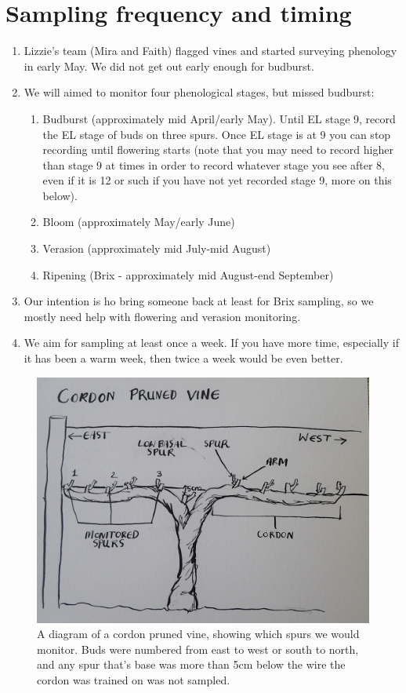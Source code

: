 \documentclass[11pt,letter]{article}
\begin{document}
\section{Sampling frequency and timing}
\begin{enumerate}
  \item Lizzie's team (Mira and Faith) flagged vines and started surveying phenology in early May. We did not get out early enough for budburst. 
  \item We will aimed to monitor four phenological stages, but missed budburst:
  \begin{enumerate}
	\item Budburst (approximately mid April/early May). Until EL stage 9, record the EL stage of buds on three spurs. Once EL stage is at 9 you can stop recording until flowering starts (note that you may need to record higher than stage 9 at times in order to record whatever stage you see after 8, even if it is 12 or such if you have not yet recorded stage 9, more on this below).
	\item Bloom (approximately May/early June)
  	\item Verasion (approximately mid July-mid August)
  	\item Ripening (Brix - approximately mid August-end September)
  \end{enumerate}
  \item Our intention is ho bring someone back at least for Brix sampling, so we mostly need help with flowering and verasion monitoring. 
  \item We aim for sampling at least once a week. If you have more time, especially if it has been a warm week, then twice a week would be even better.

\end{enumerate}


\begin{figure}%
  \includegraphics[width=\linewidth]{CordonPruned.jpg}
  \caption{A diagram of a cordon pruned vine, showing which spurs we would monitor. Buds were numbered from east to west or south to north, and any spur that's base was more than 5cm below the wire the cordon was trained on was not sampled.}
  \label{fig:CordonPruned}
\end{figure}
\end{document}
